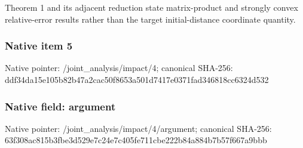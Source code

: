 \documentclass[10pt,a4paper]{article}
\begin{document}
\begingroup\raggedright\sloppy Theorem 1 and its adjacent reduction state matrix-product and strongly convex relative-error results rather than the target initial-distance coordinate quantity.\par\endgroup

\subsubsection{Native item 5}
Native pointer: /joint\_\allowbreak{}analysis/impact/4; canonical SHA-256: ddf34da15e105b82b47a2cac50f8653a501d7417e0371fad346818cc6324d532

\subsubsection{Native field: argument}
Native pointer: /joint\_\allowbreak{}analysis/impact/4/argument; canonical SHA-256: 63f308ac815b3fbe3d529e7c24e7c405fe711cbe222b84a884b7b57f667a9bbb
\end{document}
